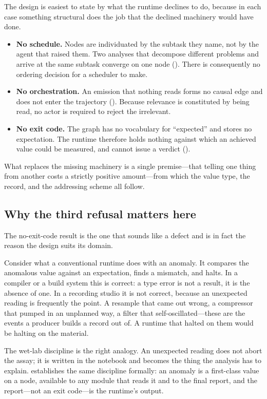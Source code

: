 \documentclass[11pt,twocolumn,a4paper]{article}
\theoremstyle{definition}
\theoremstyle{remark}
\begin{document}
The design is easiest to state by what the runtime declines to do, because in
each case something structural does the job that the declined machinery would
have done.

\begin{itemize}[leftmargin=1.4em]
\item \textbf{No schedule.} Nodes are individuated by the subtask they name, not
  by the agent that raised them. Two analyses that decompose different problems
  and arrive at the same subtask converge on one node
  (). There is consequently no ordering decision for a
  scheduler to make.
\item \textbf{No orchestration.} An emission that nothing reads forms no causal
  edge and does not enter the trajectory (). Because relevance
  is constituted by being read, no actor is required to reject the irrelevant.
\item \textbf{No exit code.} The graph has no vocabulary for ``expected'' and
  stores no expectation. The runtime therefore holds nothing against which an
  achieved value could be measured, and cannot issue a verdict
  ().
\end{itemize}

What replaces the missing machinery is a single premise---that telling one thing
from another costs a strictly positive amount---from which the value type, the
record, and the addressing scheme all follow.

\subsection{Why the third refusal matters here}

The no-exit-code result is the one that sounds like a defect and is in fact the
reason the design suits its domain.

Consider what a conventional runtime does with an anomaly. It compares the
anomalous value against an expectation, finds a mismatch, and halts. In a
compiler or a build system this is correct: a type error is not a result, it is
the absence of one. In a recording studio it is not correct, because an
unexpected reading is frequently the point. A resample that came out wrong, a
compressor that pumped in an unplanned way, a filter that self-oscillated---these
are the events a producer builds a record out of. A runtime that halted on them
would be halting on the material.

The wet-lab discipline is the right analogy. An unexpected reading does not abort
the assay; it is written in the notebook and becomes the thing the analysis has to
explain.  establishes the same discipline formally: an
anomaly is a first-class value on a node, available to any module that reads it
and to the final report, and the report---not an exit code---is the runtime's
output.
\end{document}
